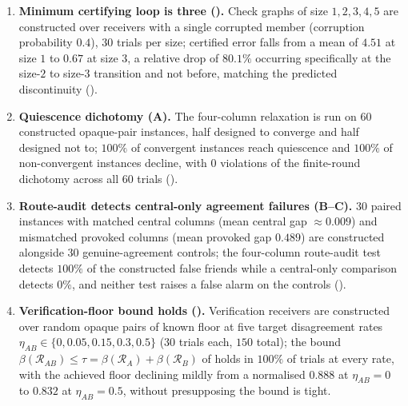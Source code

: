 \documentclass[11pt,twocolumn,a4paper]{article}
\theoremstyle{rdm}
\theoremstyle{definition}
\theoremstyle{remark}
\newcommand{\flo}{\beta}
\newcommand{\Rec}{\mathcal{R}}
\begin{document}
\begin{enumerate}[leftmargin=*,itemsep=2pt]
dynamic-programming optimum of $0.959$--$0.985$ depending on budget, and the
single worst trial across all $150$ runs ($0.658$ at $B=2.5$) still clears
the $(1-1/e)\approx0.632$ worst-case guarantee with margin
().
\item \textbf{Minimum certifying loop is three ().}
Check graphs of size $1,2,3,4,5$ are constructed over receivers with a
single corrupted member (corruption probability $0.4$), $30$ trials per
size; certified error falls from a mean of $4.51$ at size $1$ to $0.67$ at
size $3$, a relative drop of $80.1\%$ occurring specifically at the size-$2$
to size-$3$ transition and not before, matching the predicted discontinuity
().
\item \textbf{Quiescence dichotomy (A).}
The four-column relaxation is run on $60$ constructed opaque-pair instances,
half designed to converge and half designed not to; $100\%$ of convergent
instances reach quiescence and $100\%$ of non-convergent instances decline,
with $0$ violations of the finite-round dichotomy across all $60$ trials
().
\item \textbf{Route-audit detects central-only agreement failures
(B--C).} $30$ paired instances with
matched central columns (mean central gap $\approx0.009$) and mismatched
provoked columns (mean provoked gap $0.489$) are constructed alongside $30$
genuine-agreement controls; the four-column route-audit test detects
$100\%$ of the constructed false friends while a central-only comparison
detects $0\%$, and neither test raises a false alarm on the controls
().
\item \textbf{Verification-floor bound holds
().} Verification receivers are
constructed over random opaque pairs of known floor at five target
disagreement rates $\eta_{AB}\in\{0,0.05,0.15,0.3,0.5\}$ ($30$ trials each,
$150$ total); the bound $\flo(\Rec_{AB})\le\tau=\flo(\Rec_A)+\flo(\Rec_B)$ of
 holds in $100\%$ of trials at every rate, with the
achieved floor declining mildly from a normalised $0.888$ at $\eta_{AB}=0$
to $0.832$ at $\eta_{AB}=0.5$, without presupposing the bound is tight.
\end{enumerate}
\end{document}
